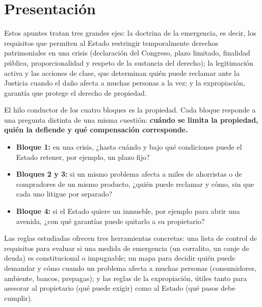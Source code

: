 \documentclass[12pt,oneside]{book}
\begin{document}
\tableofcontents

\chapter*{Presentación}

Estos apuntes tratan tres grandes ejes: la doctrina de la emergencia, es decir, los requisitos que permiten al Estado restringir temporalmente derechos patrimoniales en una crisis (declaración del Congreso, plazo limitado, finalidad pública, proporcionalidad y respeto de la sustancia del derecho); la legitimación activa y las acciones de clase, que determinan quién puede reclamar ante la Justicia cuando el daño afecta a muchas personas a la vez; y la expropiación, garantía que protege el derecho de propiedad.

\begin{important}
El hilo conductor de los cuatro bloques es la propiedad. Cada bloque responde a una pregunta distinta de una misma cuestión: \textbf{cuándo se limita la propiedad, quién la defiende y qué compensación corresponde.}
\end{important}

\begin{itemize}
    \item \textbf{Bloque 1:} en una crisis, ¿hasta cuándo y bajo qué condiciones puede el Estado retener, por ejemplo, un plazo fijo?
    \item \textbf{Bloques 2 y 3:} si un mismo problema afecta a miles de ahorristas o de compradores de un mismo producto, ¿quién puede reclamar y cómo, sin que cada uno litigue por separado?
    \item \textbf{Bloque 4:} si el Estado quiere un inmueble, por ejemplo para abrir una avenida, ¿con qué garantías puede quitarlo a su propietario?
\end{itemize}

Las reglas estudiadas ofrecen tres herramientas concretas: una lista de control de requisitos para evaluar si una medida de emergencia (un corralito, un canje de deuda) es constitucional o impugnable; un mapa para decidir quién puede demandar y cómo cuando un problema afecta a muchas personas (consumidores, ambiente, bancos, prepagas); y las reglas de la expropiación, útiles tanto para asesorar al propietario (qué puede exigir) como al Estado (qué pasos debe cumplir).
\end{document}
